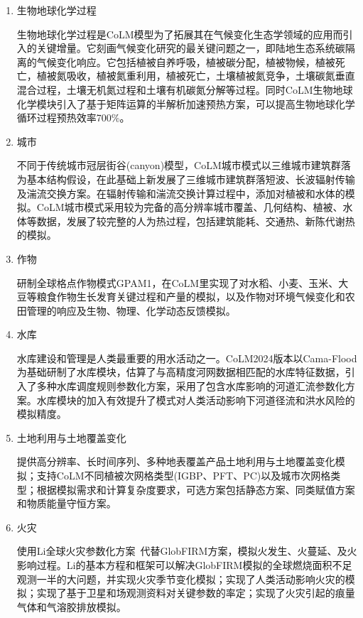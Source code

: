 \begin{enumerate}[label={\arabic*)}]
    \item 生物地球化学过程

    生物地球化学过程是CoLM模型为了拓展其在气候变化生态学领域的应用而引入的关键增量。它刻画气候变化研究的最关键问题之一，即陆地生态系统碳隔离的气候变化响应。它包括植被自养呼吸，植被碳分配，植被物候，植被死亡，植被氮吸收，植被氮重利用，植被死亡，土壤植被氮竞争，土壤碳氮垂直混合过程，土壤无机氮过程和土壤有机碳氮分解等过程。同时CoLM生物地球化学模块引入了基于矩阵运算的半解析加速预热方案，可以提高生物地球化学循环过程预热效率700\%。

    \item 城市
    
    不同于传统城市冠层街谷(canyon)模型，CoLM城市模式以三维城市建筑群落为基本结构假设，在此基础上新发展了三维城市建筑群落短波、长波辐射传输及湍流交换方案。在辐射传输和湍流交换计算过程中，添加对植被和水体的模拟。CoLM城市模式采用较为完备的高分辨率城市覆盖、几何结构、植被、水体等数据，发展了较完整的人为热过程，包括建筑能耗、交通热、新陈代谢热的模拟。
    
    \item 作物 

    研制全球格点作物模式GPAM1，在CoLM里实现了对水稻、小麦、玉米、大豆等粮食作物生长发育关键过程和产量的模拟，以及作物对环境气候变化和农田管理的响应及生物、物理、化学动态反馈模拟。
    
    \item 水库

    水库建设和管理是人类最重要的用水活动之一。CoLM2024版本以Cama-Flood为基础研制了水库模块，估算了与高精度河网数据相匹配的水库特征数据，引入了多种水库调度规则参数化方案，采用了包含水库影响的河道汇流参数化方案。水库模块的加入有效提升了模式对人类活动影响下河道径流和洪水风险的模拟精度。
    
    \item 土地利用与土地覆盖变化 

    提供高分辨率、长时间序列、多种地表覆盖产品土地利用与土地覆盖变化模拟；支持CoLM不同植被次网格类型(IGBP、PFT、PC)以及城市次网格类型；根据模拟需求和计算复杂度要求，可选方案包括静态方案、同类赋值方案和物质能量守恒方案。
    
    \item 火灾

    使用Li全球火灾参数化方案~\citep{LiF2012,LiF2013,LiF2017,LiF2019}代替GlobFIRM方案，模拟火发生、火蔓延、及火影响过程。Li的基本方程和框架可以解决GlobFIRM模拟的全球燃烧面积不足观测一半的大问题，并实现火灾季节变化模拟；实现了人类活动影响火灾的模拟；实现了基于卫星和场观测资料对关键参数的率定；实现了火灾引起的痕量气体和气溶胶排放模拟。


\end{enumerate}
